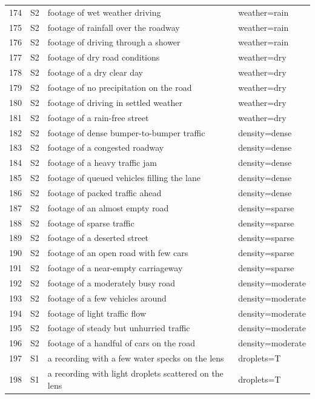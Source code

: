\begin{longtable}{r l p{8.6cm} p{5.6cm}}
174 & S2 & footage of wet weather driving & weather=rain\\
175 & S2 & footage of rainfall over the roadway & weather=rain\\
176 & S2 & footage of driving through a shower & weather=rain\\
177 & S2 & footage of dry road conditions & weather=dry\\
178 & S2 & footage of a dry clear day & weather=dry\\
179 & S2 & footage of no precipitation on the road & weather=dry\\
180 & S2 & footage of driving in settled weather & weather=dry\\
181 & S2 & footage of a rain-free street & weather=dry\\
182 & S2 & footage of dense bumper-to-bumper traffic & density=dense\\
183 & S2 & footage of a congested roadway & density=dense\\
184 & S2 & footage of a heavy traffic jam & density=dense\\
185 & S2 & footage of queued vehicles filling the lane & density=dense\\
186 & S2 & footage of packed traffic ahead & density=dense\\
187 & S2 & footage of an almost empty road & density=sparse\\
188 & S2 & footage of sparse traffic & density=sparse\\
189 & S2 & footage of a deserted street & density=sparse\\
190 & S2 & footage of an open road with few cars & density=sparse\\
191 & S2 & footage of a near-empty carriageway & density=sparse\\
192 & S2 & footage of a moderately busy road & density=moderate\\
193 & S2 & footage of a few vehicles around & density=moderate\\
194 & S2 & footage of light traffic flow & density=moderate\\
195 & S2 & footage of steady but unhurried traffic & density=moderate\\
196 & S2 & footage of a handful of cars on the road & density=moderate\\
197 & S1 & a recording with a few water specks on the lens & droplets=T\\
198 & S1 & a recording with light droplets scattered on the lens & droplets=T\\

\end{longtable}
